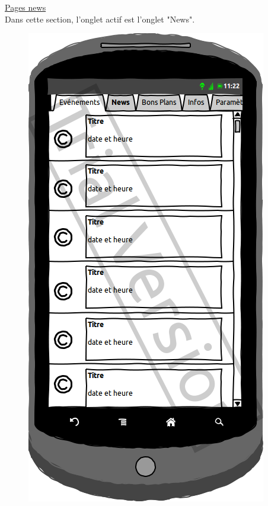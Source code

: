 \documentclass[a4paper, 11px]{article}
\begin{document}
\underline{Pages news}\\
Dans cette section, l'onglet actif est l'onglet "News".
\vfill
\begin{figure}[htbp]
	\begin{minipage}[c]{.50\linewidth}
		\begin{center}
			\includegraphics[scale=0.3]{../../Sketch/Android/News.png}
		\end{center}
	\end{minipage}
	\hfill
	\begin{minipage}[c]{.50\linewidth}
		\begin{center}

\end{center}
\end{minipage}
\end{figure}
\end{document}
